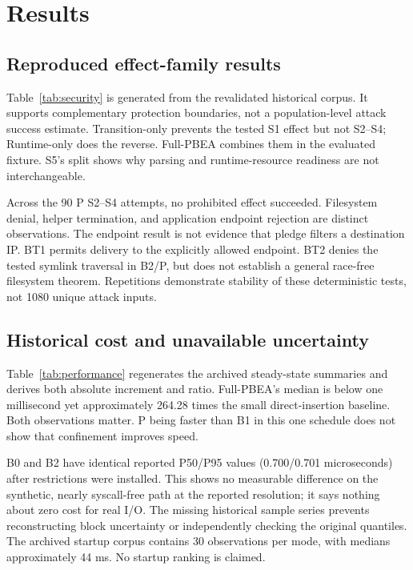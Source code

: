 \documentclass[electronics,article,submit,pdftex,moreauthors]{Definitions/mdpi}
\newcommand{\EvidenceDir}{../../../work_reports/pbea/204_Astra_review/revision/generated}
\begin{document}
\section{Results}\label{sec:results}
\subsection{Reproduced effect-family results}
Table~\ref{tab:security} is generated from the revalidated historical corpus. It supports complementary protection boundaries, not a population-level attack success estimate. Transition-only prevents the tested S1 effect but not S2--S4; Runtime-only does the reverse. Full-PBEA combines them in the evaluated fixture. S5's split shows why parsing and runtime-resource readiness are not interchangeable.
\begin{table}[H]\caption{Historical results, as numerator/denominator. N/A excludes an absent fault point.}\label{tab:security}\centering

\end{table}

Across the 90 P S2--S4 attempts, no prohibited effect succeeded. Filesystem denial, helper termination, and application endpoint rejection are distinct observations. The endpoint result is not evidence that pledge filters a destination IP. BT1 permits delivery to the explicitly allowed endpoint. BT2 denies the tested symlink traversal in B2/P, but does not establish a general race-free filesystem theorem. Repetitions demonstrate stability of these deterministic tests, not 1080 unique attack inputs.

\subsection{Historical cost and unavailable uncertainty}
Table~\ref{tab:performance} regenerates the archived steady-state summaries and derives both absolute increment and ratio. Full-PBEA's median is below one millisecond yet approximately 264.28 times the small direct-insertion baseline. Both observations matter. P being faster than B1 in this one schedule does not show that confinement improves speed.
\begin{table}[H]\caption{Historical synthetic S0 summaries in microseconds; new independent-block measurements are a separate corpus.}\label{tab:performance}\centering

\end{table}

B0 and B2 have identical reported P50/P95 values (0.700/0.701 microseconds) after restrictions were installed. This shows no measurable difference on the synthetic, nearly syscall-free path at the reported resolution; it says nothing about zero cost for real I/O. The missing historical sample series prevents reconstructing block uncertainty or independently checking the original quantiles. The archived startup corpus contains 30 observations per mode, with medians approximately 44 ms. No startup ranking is claimed.
\end{document}
